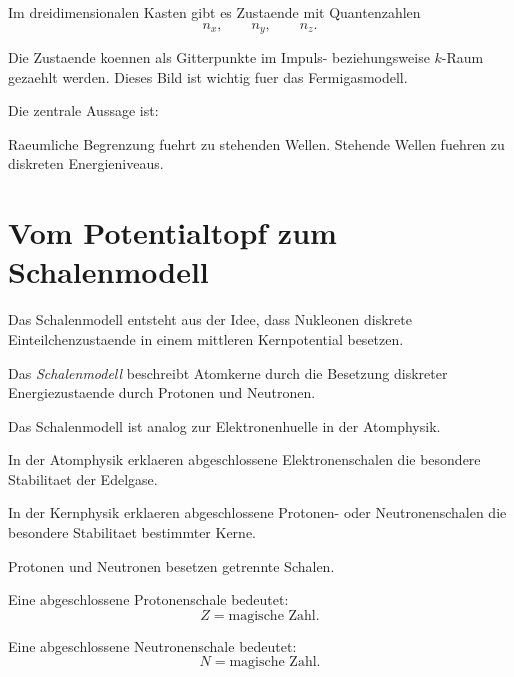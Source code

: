 \begin{conceptbox}
Im dreidimensionalen Kasten gibt es Zustaende mit Quantenzahlen
\begin{equation*}
    n_x,\qquad n_y,\qquad n_z.
\end{equation*}

Die Zustaende koennen als Gitterpunkte im Impuls- beziehungsweise $k$-Raum gezaehlt
werden.
Dieses Bild ist wichtig fuer das Fermigasmodell.
\end{conceptbox}

\begin{examtipbox}
Die zentrale Aussage ist:

Raeumliche Begrenzung fuehrt zu stehenden Wellen.
Stehende Wellen fuehren zu diskreten Energieniveaus.
\end{examtipbox}

\section{Vom Potentialtopf zum Schalenmodell}

Das Schalenmodell entsteht aus der Idee, dass Nukleonen diskrete Einteilchenzustaende
in einem mittleren Kernpotential besetzen.

\begin{definitionbox}
Das \emph{Schalenmodell} beschreibt Atomkerne durch die Besetzung diskreter
Energiezustaende durch Protonen und Neutronen.
\end{definitionbox}

\begin{conceptbox}
Das Schalenmodell ist analog zur Elektronenhuelle in der Atomphysik.

In der Atomphysik erklaeren abgeschlossene Elektronenschalen die besondere Stabilitaet
der Edelgase.

In der Kernphysik erklaeren abgeschlossene Protonen- oder Neutronenschalen die
besondere Stabilitaet bestimmter Kerne.
\end{conceptbox}

\begin{conceptbox}
Protonen und Neutronen besetzen getrennte Schalen.

Eine abgeschlossene Protonenschale bedeutet:
\begin{equation*}
    Z = \text{magische Zahl}.
\end{equation*}

Eine abgeschlossene Neutronenschale bedeutet:
\begin{equation*}
    N = \text{magische Zahl}.
\end{equation*}
\end{conceptbox}

